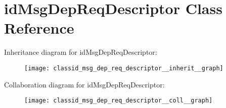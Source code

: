 \hypertarget{classid_msg_dep_req_descriptor}{}\section{id\+Msg\+Dep\+Req\+Descriptor Class Reference}
\label{classid_msg_dep_req_descriptor}


Inheritance diagram for id\+Msg\+Dep\+Req\+Descriptor\+:\nopagebreak
\begin{figure}[H]
\begin{center}
\leavevmode
\texttt{[image: classid\_msg\_dep\_req\_descriptor\_\_inherit\_\_graph]}
\end{center}
\end{figure}


Collaboration diagram for id\+Msg\+Dep\+Req\+Descriptor\+:\nopagebreak
\begin{figure}[H]
\begin{center}
\leavevmode
\texttt{[image: classid\_msg\_dep\_req\_descriptor\_\_coll\_\_graph]}
\end{center}
\end{figure}
